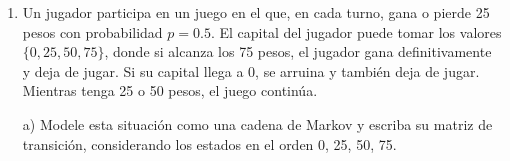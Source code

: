 \documentclass[a4paper, 12pt]{article}
\newcommand{\Aspace}{0.2cm}
\begin{document}
\begin{enumerate}
            \vspace{\Aspace} \par
            c) ¿Cuál es la distribución estacionaria?
            \\ { \color{azul} 
                \(
                    \\ $ \pi P = \pi $ \\
                    \begin{array}{cccc}
                        \begin{bmatrix}
                            \pi G   &   \pi P
                        \end{bmatrix}
                    
                        \begin{bmatrix}
                            0{.}7   &   0{.}3   \\
                            0{.}4   &   0{.}6                       
                        \end{bmatrix}

                        =

                        \begin{bmatrix}
                            \pi G   &   \pi P
                        \end{bmatrix}                   
                    \end{array}
                \)
            }

            \vspace{\Aspace} \par
            d) ¿Cuál es la distribución de probabilidad después de muchos partidos?
            \\ { \color{azul}  }

        
        \newpage
    \item Un jugador participa en un juego en el que, en cada turno, gana o pierde 25 pesos con probabilidad $p = 0{.}5$. El capital del jugador puede tomar los valores $\{0, 25, 50, 75\}$, donde si alcanza los 75 pesos, el jugador gana definitivamente y deja de jugar. Si su capital llega a 0, se arruina y también deja de jugar. Mientras tenga 25 o 50 pesos, el juego continúa.
            \vspace{\Aspace} \par
            a) Modele esta situación como una cadena de Markov y escriba su matriz de transición, considerando los estados en el orden 0, 25, 50, 75.
            \\ { \color{azul}  }


\end{enumerate}
\end{document}
